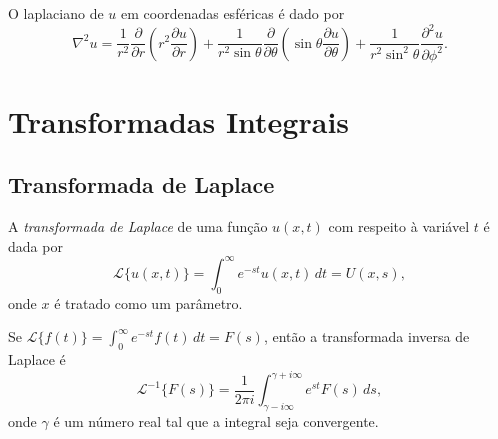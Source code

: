 \documentclass{article}
\begin{document}
\begin{rem}
    O laplaciano de \(u\) em coordenadas esféricas é dado por
    \begin{equation}
        \nabla^2 u = \frac{1}{r^2} \frac{\partial}{\partial r}\left(r^2 \frac{\partial u}{\partial r}\right) + \frac{1}{r^2 \sin\theta} \frac{\partial}{\partial \theta}\left(\sin\theta \frac{\partial u}{\partial \theta}\right) + \frac{1}{r^2 \sin^2\theta} \frac{\partial^2 u}{\partial \phi^2}.
    \end{equation}
\end{rem}

\section{Transformadas Integrais}

\subsection{Transformada de Laplace}

\begin{defn}
    A \emph{transformada de Laplace} de uma função \(u(x,t)\) com respeito à variável \(t\) é dada por
    \begin{equation}
        \mathcal{L}\{u(x,t)\} = \int_{0}^{\infty} e^{-st} u(x,t) \, dt = U(x,s),
    \end{equation}
    \noindent onde \(x\) é tratado como um parâmetro.
\end{defn}

\begin{rem}
    Se \(\mathcal{L}\{f(t)\} = \int_{0}^{\infty} e^{-st} f(t) \, dt = F(s)\), então a transformada inversa de Laplace é
    \begin{equation}
        \mathcal{L}^{-1}\{F(s)\} = \frac{1}{2\pi i} \int_{\gamma-i\infty}^{\gamma+i\infty} e^{st} F(s) \, ds,
    \end{equation}
    \noindent onde \(\gamma\) é um número real tal que a integral seja convergente.
\end{rem}
\end{document}
